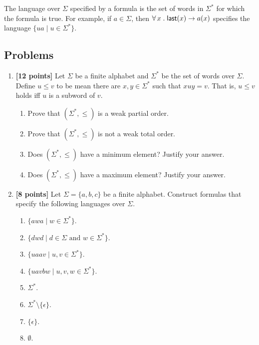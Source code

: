 \documentclass[11pt,fleqn]{article}
\newcommand{\be}{\begin{enumerate}}
\newcommand{\ee}{\end{enumerate}}
\newcommand{\mname}[1]{\mbox{\sf #1}}
\newcommand{\ForallApp}{\forall\,}
\newcommand{\mdot}{\mathrel.}
\newcommand{\set}[1]{{\{ #1 \}}}
\begin{document}
The language over $\Sigma$ specified by a formula is the set of words
in $\Sigma^*$ for which the formula is true.  For example, if $a \in
\Sigma$, then $\ForallApp x \mdot \mname{last}(x) \rightarrow a(x)$ specifies
the language $\set{ua \mid u \in \Sigma^*}$.

\subsection*{Problems}

\be

  \item \textbf{[12 points]} Let $\Sigma$ be a finite alphabet and
    $\Sigma^*$ be the set of words over $\Sigma$.  Define $u \le v$ to
    be mean there are $x,y \in \Sigma^*$ such that $xuy = v$.  That
    is, $u \le v$ holds iff $u$ is a subword of $v$.

  \be

    \item Prove that $(\Sigma^*,\le)$ is a weak partial order.

    \item Prove that $(\Sigma^*,\le)$ is not a weak total order.

    \item Does $(\Sigma^*,\le)$ have a minimum element?  Justify your
      answer.

    \item Does $(\Sigma^*,\le)$ have a maximum element?  Justify your
      answer.

  \ee

  \item \textbf{[8 points]} Let $\Sigma = \set{a,b,c}$ be a finite
    alphabet.  Construct formulas that specify the following languages
    over $\Sigma$.

  \be

    \item $\set{awa \mid w \in \Sigma^*}$.

    \item $\set{dwd \mid d \in \Sigma \text{ and } w \in \Sigma^*}$.

    \item $\set{uaav \mid u, v \in \Sigma^*}$.
    
    \item $\set{uavbw \mid u,v,w \in \Sigma^*}$.

    \item $\Sigma^*$.

    \item $\Sigma^* \setminus \set{\epsilon}$.

    \item $\set{\epsilon}$.

    \item $\emptyset$.

  \ee

\ee
\end{document}
